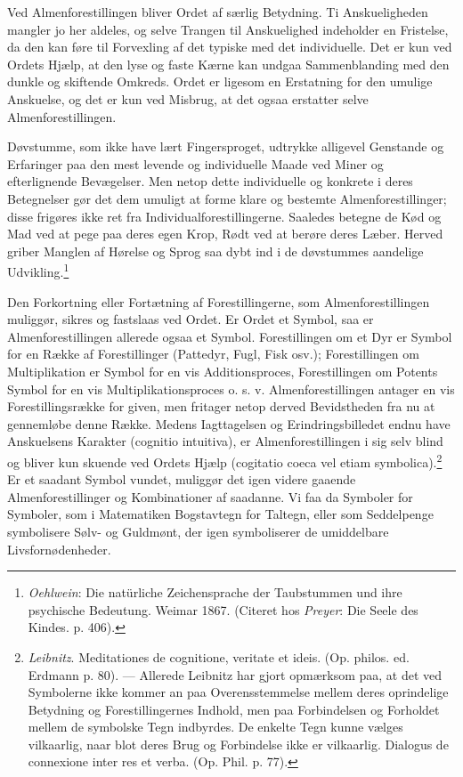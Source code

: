 \documentclass[12pt,a4paper,openany]{book}
\newcommand{\opage}[1]{\marginnote{\footnotesize\textit{[#1]}}}
\begin{document}
Ved Almenforestillingen bliver Ordet af særlig Betydning. Ti
Anskueligheden mangler jo her aldeles, og selve Trangen til Anskuelighed
indeholder en Fristelse, da den kan føre til Forvexling af det typiske
med det individuelle. Det er kun ved Ordets Hjælp, at den lyse og faste
Kærne kan undgaa Sammenblanding med den dunkle og skiftende Omkreds.
Ordet er ligesom en Erstatning for den umulige Anskuelse, og det er kun
ved Misbrug, at det ogsaa erstatter selve Almenforestillingen.

Døvstumme, som ikke have lært Fingersproget, udtrykke alligevel
Genstande og Erfaringer paa den mest levende og individuelle Maade ved
Miner og efterlignende Bevægelser. Men netop dette individuelle og
konkrete i deres Betegnelser gør det dem umuligt at forme klare og
bestemte Almenforestillinger; disse frigøres ikke ret fra
Individualforestillingerne. Saaledes betegne de Kød og Mad ved at pege
paa deres egen Krop, Rødt ved at berøre deres Læber. Herved griber
Manglen
\opage{209}af Hørelse og Sprog saa dybt ind i de døvstummes aandelige
Udvikling.\footnote[1]{\emph{Oehlwein}: Die natürliche Zeichensprache
der Taubstummen und ihre psychische Bedeutung. Weimar 1867. (Citeret hos
\emph{Preyer}: Die Seele des Kindes. p. 406).}

Den Forkortning eller Fortætning af Forestillingerne, som
Almenforestillingen muliggør, sikres og fastslaas ved Ordet. Er Ordet et
Symbol, saa er Almenforestillingen allerede ogsaa et Symbol.
Forestillingen om et Dyr er Symbol for en Række af Forestillinger
(Pattedyr, Fugl, Fisk osv.); Forestillingen om Multiplikation er Symbol
for en vis Additionsproces, Forestillingen om Potents Symbol for en vis
Multiplikationsproces o. s. v. Almenforestillingen antager en vis
Forestillingsrække for given, men fritager netop derved Bevidstheden fra
nu at gennemløbe denne Række. Medens Iagttagelsen og Erindringsbilledet
endnu have Anskuelsens Karakter (cognitio intuitiva), er
Almenforestillingen i sig selv blind og bliver kun skuende ved Ordets
Hjælp (cogitatio coeca vel etiam
symbolica).\footnote[2]{\emph{Leibnitz}. Meditationes de cognitione,
veritate et ideis. (Op. philos. ed. Erdmann p. 80). --- Allerede
Leibnitz har gjort opmærksom paa, at det ved Symbolerne ikke kommer an
paa Overensstemmelse mellem deres oprindelige Betydning og
Forestillingernes Indhold, men paa Forbindelsen og Forholdet mellem de
symbolske Tegn indbyrdes. De enkelte Tegn kunne vælges vilkaarlig, naar
blot deres Brug og Forbindelse ikke er vilkaarlig. Dialogus de
connexione inter res et verba. (Op. Phil. p. 77).} Er et saadant Symbol
vundet, muliggør det igen videre gaaende Almenforestillinger og
Kombinationer af saadanne. Vi faa da Symboler for Symboler, som i
Matematiken Bogstavtegn for Taltegn, eller som Seddelpenge symbolisere
Sølv- og Guldmønt, der igen symboliserer de umiddelbare
Livsfornødenheder.
\end{document}
